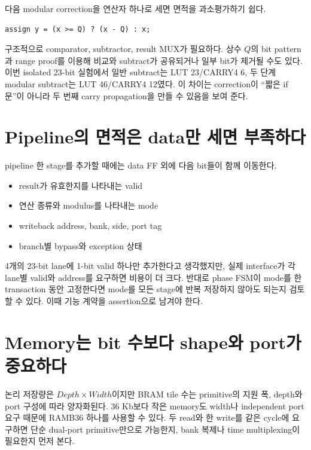 다음 modular correction을 연산자 하나로 세면 면적을 과소평가하기 쉽다.

\begin{lstlisting}
assign y = (x >= Q) ? (x - Q) : x;
\end{lstlisting}

구조적으로 comparator, subtractor, result MUX가 필요하다. 상수 $Q$의 bit pattern과
range proof를 이용해 비교와 subtract가 공유되거나 일부 bit가 제거될 수도 있다.
이번 isolated 23-bit 실험에서 일반 subtract는 LUT 23/CARRY4 6, 두 단계
modular subtract는 LUT 46/CARRY4 12였다. 이 차이는 correction이 ``짧은 if문''이
아니라 두 번째 carry propagation을 만들 수 있음을 보여 준다.

\section{Pipeline의 면적은 data만 세면 부족하다}

pipeline 한 stage를 추가할 때에는 data FF 외에 다음 bit들이 함께 이동한다.

\begin{itemize}
  \item result가 유효한지를 나타내는 valid
  \item 연산 종류와 modulus를 나타내는 mode
  \item writeback address, bank, side, port tag
  \item branch별 bypass와 exception 상태
\end{itemize}

4개의 23-bit lane에 1-bit valid 하나만 추가한다고 생각했지만, 실제 interface가
각 lane별 valid와 address를 요구하면 비용이 더 크다. 반대로 phase FSM이 mode를
한 transaction 동안 고정한다면 mode를 모든 stage에 반복 저장하지 않아도 되는지
검토할 수 있다. 이때 기능 계약을 assertion으로 남겨야 한다.

\section{Memory는 bit 수보다 shape와 port가 중요하다}

논리 저장량은 $Depth\times Width$이지만 BRAM tile 수는 primitive의 지원 폭,
depth와 port 구성에 따라 양자화된다. 36 Kb보다 작은 memory도 width나 independent
port 요구 때문에 RAMB36 하나를 사용할 수 있다. 두 read와 한 write를 같은
cycle에 요구하면 단순 dual-port primitive만으로 가능한지, bank 복제나 time
multiplexing이 필요한지 먼저 본다.

